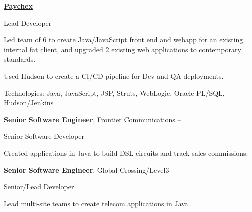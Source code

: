 \documentclass[MMMMyyyy,nonstopmode]{simpleresumecv_stacked}
\newcommand{\tech}[1]{\Gap\textrm{Technologies:} #1}
\newcommand{\comment}[1]{\ignorespaces} %
\newif\ifLOCATION
\begin{document}
\begin{Body}
\Entry
\href{http://www.paychex.com/}
{\textbf{Paychex}}
\hfill 
 -- 

Lead Developer
\ifLOCATION
\hfill
Rochester, New York
\fi

\begin{Detail}
Led team of 6 to create Java/JavaScript front end and webapp for an existing internal fat client, and upgraded 2 existing web applications to contemporary standards. 

Used Hudson to create a CI/CD pipeline for Dev and QA deployments.

\iffalse
\BulletItem
Member of architecture team to research and set five-year strategy for web application strategy.
\fi

\tech{Java, JavaScript, JSP, Struts, WebLogic, Oracle PL/SQL, Hudson/Jenkins}
\end{Detail}
\fi %

\Entry
\textbf{Senior Software Engineer}, Frontier Communications
\hfill 
 -- 

Senior Software Developer
\ifLOCATION
\hfill
Rochester, New York
\fi

\begin{Detail}
Created applications in Java to build DSL circuits and track sales commissions.


\end{Detail}

\Entry
\textbf{Senior Software Engineer}, Global Crossing/Level3
\hfill 
 -- 

Senior/Lead Developer
\ifLOCATION
\hfill
Rochester, New York
\fi

\begin{Detail}
Lead multi-site teams to create telecom applications in Java.


\end{Detail}
\end{Body}
\end{document}

